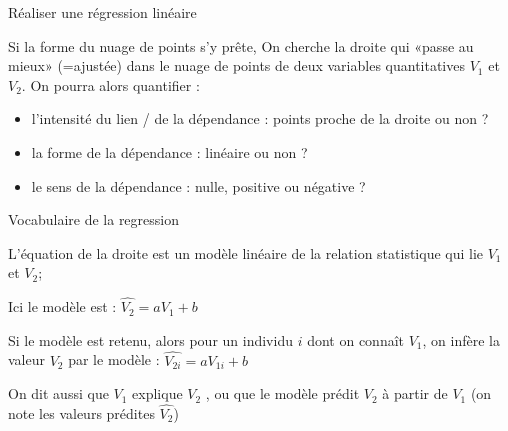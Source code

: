 \documentclass{beamer}
\begin{document}
\begin{frame}[fragile]{Réaliser une régression linéaire}



Si la forme du nuage de points s'y prête,  On cherche la droite qui «passe au mieux» (=\alert{ajustée}) dans le nuage de points de deux variables quantitatives $V_1$ et $V_2$. On pourra alors quantifier : 

\begin{itemize}
\item l'\alert{intensité} du lien / de la dépendance  : points proche de la droite ou non ?
\item la \alert{forme} de la dépendance : linéaire ou non ?
\item le \alert{sens} de la dépendance  : nulle, positive ou négative ?
\end{itemize}

\end{frame}


\begin{frame}{Vocabulaire de la regression}


L'\alert{équation} de la droite  est un \alert{modèle linéaire} de la relation statistique qui lie $V_1$ et $V_2$; 

Ici le modèle est :  $\hat{V_2}=aV_1+b$


 \vspace{0.5cm}


Si le modèle est retenu, alors pour un individu $i$ dont on connaît $V_1$, on infère la valeur $V_2$ par le modèle :    $\hat{V_{2i}} = aV_{1i} +b$
 
 On dit aussi que $V_1$ \alert{explique} $V_2$ , ou que le modèle \alert{prédit} $V_2$ à partir de $V_1$ (on note les valeurs prédites $\hat{V_2}$)
 


\end{frame}
\end{document}
